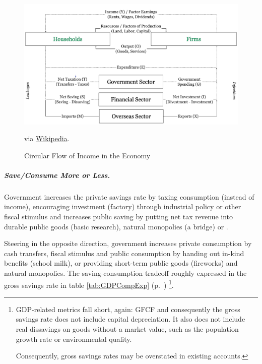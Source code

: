\begin{figure}[htbp]
	\centering
	\includegraphics[width=1\textwidth]{./img/circular-flow}  
	\caption[Circular Flow in the Economy]{Circular Flow of Income in the Economy}
	\begin{flushleft}
		\scriptsize{via \href{http://en.wikipedia.org/wiki/circular-flowofincome}{Wikipedia}}.
	\end{flushleft}
	\label{fig:circular-flow}
\end{figure}

\subparagraph[Save More or Less]{Save/Consume More or Less.} Government increases the private savings rate by taxing consumption (instead of income), encouraging investment (factory) through industrial policy or other fiscal stimulus and increases public saving by putting net tax revenue into durable public goods (basic research), natural monopolies (a bridge) or . 

Steering in the opposite direction, government increases private consumption by cash transfers, fiscal stimulus and public consumption by handing out in-kind benefits (school milk), or providing short-term public goods (fireworks) and natural monopolies. The saving-consumption tradeoff roughly expressed in the gross savings rate in table \ref{tab:GDPCompExp} (p.~\pageref{tab:GDPCompExp}) \footnote{
	GDP-related metrics fall short, again: \gls{GFCF} and consequently the gross savings rate does not include capital depreciation. It also does not include real dissavings on goods without a market value, such as the population growth rate or environmental quality. 
	
	Consequently, gross savings rates may be overstated in existing accounts.}.

